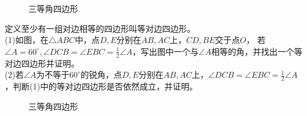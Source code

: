 \begin{figure}[H]
    \centering
    \resizebox{8cm}{!}{}
    \caption{三等角四边形}
\end{figure}
\begin{problem}
定义至少有一组对边相等的四边形叫等对边四边形。\\
(1)如图，在$\triangle ABC$中，点$D,E$分别在$AB,AC$上，$CD,BE$交于点$O$，
若$\angle A=60^\circ,\angle DCB=\angle EBC=\frac{1}{2}\angle A$，写出图中一个与$\angle A$相等的角，并找出一个等对边四边形并证明。\\
(2)若$\angle A$为不等于$60^\circ$的锐角，点$D,E$分别在$AB,AC$上，$\angle DCB=\angle EBC=\frac{1}{2}\angle A$，判断(1)中的等对边四边形是否依然成立，并证明。\\
\end{problem}
\begin{figure}[H]
    \centering
    \resizebox{4cm}{!}{}
    \caption{三等角四边形}
\end{figure}
\clearpage
